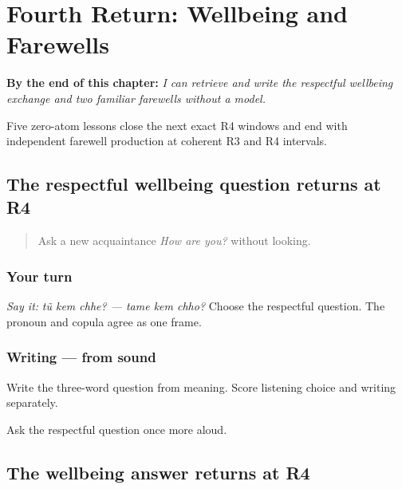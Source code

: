 
\chapter{Fourth Return: Wellbeing and Farewells}
\label{ch:gu-r4-wellbeing-farewells}

\begin{chapteropening}
\textbf{By the end of this chapter:} \emph{I can retrieve and write the respectful wellbeing exchange and two familiar farewells without a model.}

Five zero-atom lessons close the next exact R4 windows and end with independent farewell production at coherent R3 and R4 intervals.
\end{chapteropening}

\section[Practice]{The respectful wellbeing question returns at R4}

\label{lesson:GU-R18-how-are-you-r4}



\begin{quote}
Ask a new acquaintance \emph{How are you?} without looking.
\end{quote}

\subsection*{Your turn}
\emph{Say it:} \emph{tũ kem chhe? — tame kem chho?} Choose the respectful question. The pronoun and copula agree as one frame.

\subsection*{Writing — from sound}
Write the three-word question from meaning. Score listening choice and writing separately.

\begin{tcolorbox}[breakable,colback=teal!4,colframe=teal!35!black,title={Before you move on}]
Ask the respectful question once more aloud.
\end{tcolorbox}
\section[Practice]{The wellbeing answer returns at R4}

